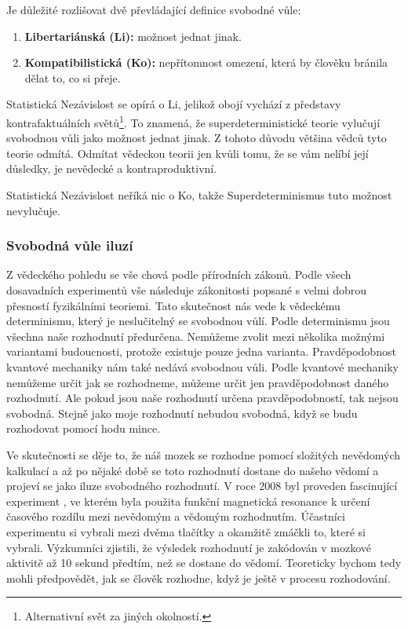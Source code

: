 Je důležité rozlišovat dvě převládající definice svobodné vůle:
\begin{enumerate}
    \item \textbf{Libertariánská (Li):} možnost jednat jinak.
    \item \textbf{Kompatibilistická (Ko):} nepřítomnost omezení, která by člověku bránila dělat to, co si přeje.
\end{enumerate}

Statistická Nezávislost se opírá o Li, jelikož obojí vychází z představy kontrafaktuálních světů\footnote[13]{Alternativní svět za jiných okolností.}. To znamená, že superdeterministické teorie vylučují svobodnou vůli jako možnost jednat jinak. Z tohoto důvodu většina vědců tyto teorie odmítá. Odmítat vědeckou teorii jen kvůli tomu, že se vám nelíbí její důsledky, je nevědecké a kontraproduktivní.

Statistická Nezávislost neříká nic o Ko, takže Superdeterminismus tuto možnost nevylučuje.

\subsubsection{Svobodná vůle iluzí}
Z vědeckého pohledu se vše chová podle přírodních zákonů. Podle všech dosavadních experimentů vše následuje zákonitosti popsané s velmi dobrou přesností fyzikálními teoriemi. Tato skutečnost nás vede k vědeckému determinismu, který je neslučitelný se svobodnou vůlí. Podle determinismu jsou všechna naše rozhodnutí předurčena. Nemůžeme zvolit mezi několika možnými variantami budoucnosti, protože existuje pouze jedna varianta. Pravděpodobnost kvantové mechaniky nám také nedává svobodnou vůli. Podle kvantové mechaniky nemůžeme určit jak se rozhodneme, můžeme určit jen pravděpodobnost daného rozhodnutí. Ale pokud jsou naše rozhodnutí určena pravděpodobností, tak nejsou svobodná. Stejně jako moje rozhodnutí nebudou svobodná, když se budu rozhodovat pomocí hodu mince.

Ve skutečnosti se děje to, že náš mozek se rozhodne pomocí složitých nevědomých kalkulací a až po nějaké době se toto rozhodnutí dostane do našeho vědomí a projeví se jako iluze svobodného rozhodnutí. V roce 2008 byl proveden fascinující experiment \parencite{DecisionDet}, ve kterém byla použita funkční magnetická resonance k určení časového rozdílu mezi nevědomým a vědomým rozhodnutím. Účastníci experimentu si vybrali mezi dvěma tlačítky a okamžitě zmáčkli to, které si vybrali. Výzkumníci zjistili, že výsledek rozhodnutí je zakódován v mozkové aktivitě až 10 sekund předtím, než se dostane do vědomí. Teoreticky bychom tedy mohli předpovědět, jak se člověk rozhodne, když je ještě v procesu rozhodování.

